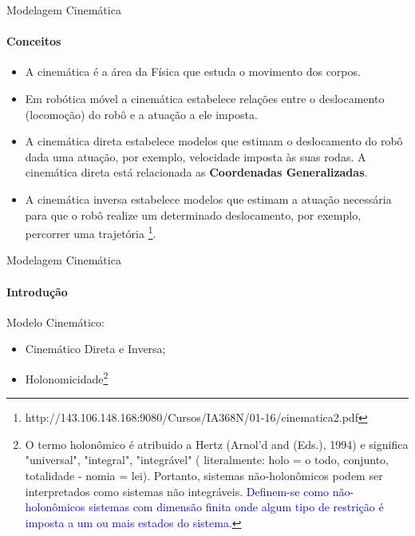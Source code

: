 \documentclass[aspectratio=169]{beamer}
\begin{document}
\begin{frame}{Modelagem Cinemática}
    \framesubtitle{Conceitos}
    \begin{itemize}
        \item A cinemática é a área da Física que estuda o movimento dos corpos.
        \item Em robótica móvel a cinemática estabelece relações entre o deslocamento (locomoção) do robô e a atuação a ele imposta.
        \item A cinemática direta estabelece modelos que estimam o deslocamento do robô dada uma atuação, por exemplo, velocidade imposta às suas rodas. A cinemática direta está relacionada as \textbf{Coordenadas Generalizadas}.
        \item A cinemática inversa estabelece modelos que estimam a atuação necessária para que o robô realize um determinado deslocamento, por exemplo, percorrer uma trajetória \footnote{http://143.106.148.168:9080/Cursos/IA368N/01-16/cinematica2.pdf}.
    \end{itemize}
\end{frame}


\begin{frame}{Modelagem Cinemática}
    \framesubtitle{Introdução}
    Modelo Cinemático:
            \begin{itemize}
                \item Cinemático Direta e Inversa;
                \item Holonomicidade\footnote{O termo holonômico é atribuido a Hertz (Arnol'd and (Eds.), 1994) e significa "universal", "integral", "integrável" ( literalmente: holo = o todo, conjunto, totalidade - nomia = lei). Portanto, sistemas não-holonômicos podem ser interpretados como sistemas não integráveis. \textcolor{blue}{Definem-se como não-holonômicos sistemas com dimensão finita onde algum tipo de restrição é imposta a um ou mais estados do sistema.}}
            \end{itemize}

\end{frame}
\end{document}
